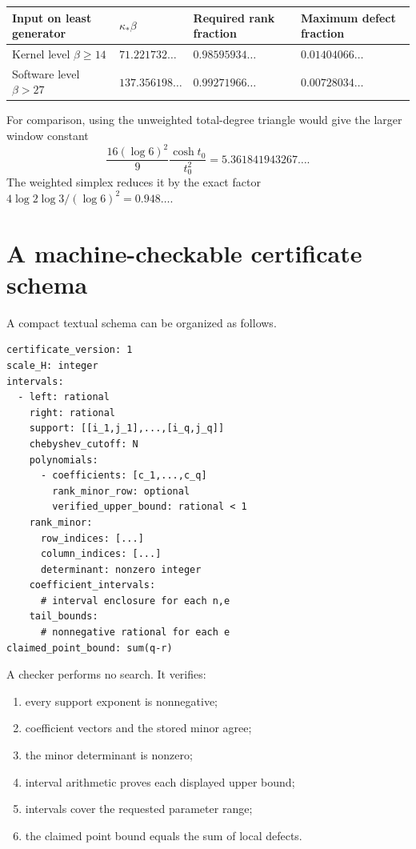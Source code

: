 \documentclass[11pt,oneside]{article}
\theoremstyle{definition}
\theoremstyle{remark}
\begin{document}
\begin{center}
\small\begin{tabular}{@{}>{\raggedright\arraybackslash}p{}>{\raggedright\arraybackslash}p{}>{\raggedright\arraybackslash}p{}>{\raggedright\arraybackslash}p{}@{}}
\toprule
Input on least generator & $\kappa_*\beta$ & Required rank fraction & Maximum defect fraction \\
\midrule
Kernel level $\beta\ge14$ & $71.221732\ldots$ & $0.98595934\ldots$ & $0.01404066\ldots$ \\
Software level $\beta>27$ & $137.356198\ldots$ & $0.99271966\ldots$ & $0.00728034\ldots$ \\
\bottomrule
\end{tabular}
\end{center}

For comparison, using the unweighted total-degree triangle would give the larger window
constant
\[
 \frac{16(\log6)^2}{9}\frac{\cosh t_0}{t_0^2}
 =5.361841943267\ldots.
\]
The weighted simplex reduces it by the exact factor
$4\log2\log3/(\log6)^2=0.948\ldots$.

\section{A machine-checkable certificate schema}
\label{app:schema}

A compact textual schema can be organized as follows.

\begin{lstlisting}[style=pseudocode]
certificate_version: 1
scale_H: integer
intervals:
  - left: rational
    right: rational
    support: [[i_1,j_1],...,[i_q,j_q]]
    chebyshev_cutoff: N
    polynomials:
      - coefficients: [c_1,...,c_q]
        rank_minor_row: optional
        verified_upper_bound: rational < 1
    rank_minor:
      row_indices: [...]
      column_indices: [...]
      determinant: nonzero integer
    coefficient_intervals:
      # interval enclosure for each n,e
    tail_bounds:
      # nonnegative rational for each e
claimed_point_bound: sum(q-r)
\end{lstlisting}

A checker performs no search.  It verifies:

\begin{enumerate}
\item every support exponent is nonnegative;
\item coefficient vectors and the stored minor agree;
\item the minor determinant is nonzero;
\item interval arithmetic proves each displayed upper bound;
\item intervals cover the requested parameter range;
\item the claimed point bound equals the sum of local defects.
\end{enumerate}
\end{document}
